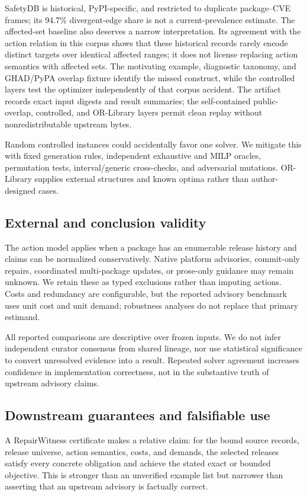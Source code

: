 \documentclass[10pt,conference]{IEEEtran}
\begin{document}
SafetyDB is historical, PyPI-specific, and restricted to duplicate package--CVE frames; its 94.7\% divergent-edge share is not a current-prevalence estimate. The affected-set baseline also deserves a narrow interpretation. Its agreement with the action relation in this corpus shows that these historical records rarely encode distinct targets over identical affected ranges; it does not license replacing action semantics with affected sets. The motivating example, diagnostic taxonomy, and GHAD/PyPA overlap fixture identify the missed construct, while the controlled layers test the optimizer independently of that corpus accident. The artifact records exact input digests and result summaries; the self-contained public-overlap, controlled, and OR-Library layers permit clean replay without nonredistributable upstream bytes.

Random controlled instances could accidentally favor one solver. We mitigate this with fixed generation rules, independent exhaustive and MILP oracles, permutation tests, interval/generic cross-checks, and adversarial mutations. OR-Library supplies external structures and known optima rather than author-designed cases.

\subsection{External and conclusion validity}
The action model applies when a package has an enumerable release history and claims can be normalized conservatively. Native platform advisories, commit-only repairs, coordinated multi-package updates, or prose-only guidance may remain unknown. We retain these as typed exclusions rather than imputing actions. Costs and redundancy are configurable, but the reported advisory benchmark uses unit cost and unit demand; robustness analyses do not replace that primary estimand.

All reported comparisons are descriptive over frozen inputs. We do not infer independent curator consensus from shared lineage, nor use statistical significance to convert unresolved evidence into a result. Repeated solver agreement increases confidence in implementation correctness, not in the substantive truth of upstream advisory claims.

\subsection{Downstream guarantees and falsifiable use}
A RepairWitness certificate makes a relative claim: for the bound source records, release universe, action semantics, costs, and demands, the selected releases satisfy every concrete obligation and achieve the stated exact or bounded objective. This is stronger than an unverified example list but narrower than asserting that an upstream advisory is factually correct.
\end{document}
